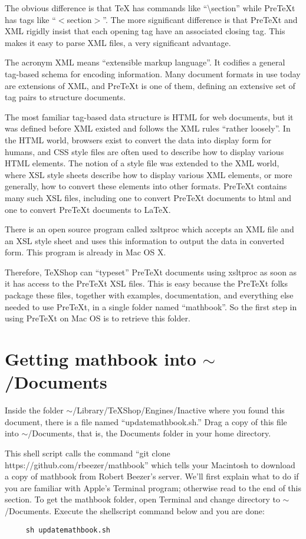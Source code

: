 \documentclass[11pt, oneside]{article}   	%
\begin{document}
The obvious difference is that TeX has commands like ``\textbackslash section'' while PreTeXt has tags like ``$<$section$>$''. The more significant difference is that PreTeXt and XML rigidly insist that each opening tag have an associated closing tag. This makes it easy to parse XML files, a very significant advantage. 

The acronym XML means ``extensible markup language''. It codifies a general tag-based schema for encoding information.  Many document formats in use today are extensions of XML, and PreTeXt is one of them, defining an extensive set of tag pairs to structure documents. 

The most familiar tag-based data structure is HTML for web documents, but it was defined before XML existed and follows the XML rules  ``rather loosely''.  In the HTML world, browsers exist to convert the data into display form for humans, and CSS style files are often used to describe how to display various HTML elements. The notion of a style file was  extended to the XML world, where XSL style sheets describe how to display various XML elements, or more generally, how to convert these elements into other formats. PreTeXt contains many such XSL files, including one to convert PreTeXt documents to html and one to convert PreTeXt documents to LaTeX.

There is an open source program called xsltproc which accepts an XML file and an XSL style sheet and uses this information to output the data in converted form. This program is already in Mac OS X.

Therefore, TeXShop can ``typeset'' PreTeXt documents using xsltproc as soon as it has access to the PreTeXt  XSL files. This is easy because the PreTeXt folks package these files, together with examples, documentation, and everything else needed to use PreTeXt, in a single folder named ``mathbook''. So the first step in using PreTeXt on Mac OS is to retrieve this folder. 

\section{Getting mathbook into $\sim$/Documents}

Inside the folder $\sim$/Library/TeXShop/Engines/Inactive where you found this document, there is a file named ``updatemathbook.sh.'' Drag a copy of this file into $\sim$/Documents, that is, the Documents folder in your home directory. 

This shell  script calls the command 
     ``git clone https://github.com/rbeezer/mathbook''
which tells your Macintosh to download a copy of mathbook from Robert Beezer's server. We'll first explain what to do if you are familiar with Apple's Terminal program; otherwise read to the end of this section. To get  the mathbook folder,  open Terminal and change directory to $\sim$/Documents. Execute the shellscript command 
below and you are done:
\begin{verbatim}
     sh updatemathbook.sh
\end{verbatim}
\end{document}
